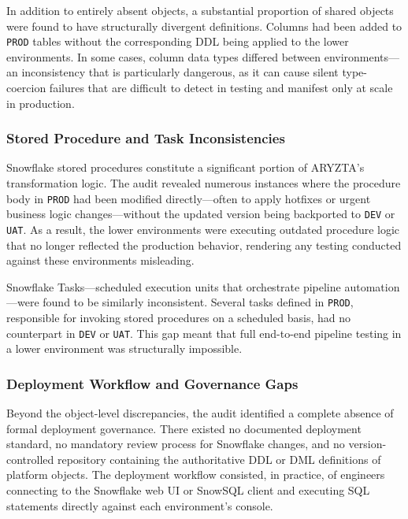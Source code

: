 In addition to entirely absent objects, a substantial proportion of shared objects were found to have structurally divergent definitions. Columns had been added to \texttt{PROD} tables without the corresponding DDL being applied to the lower environments. In some cases, column data types differed between environments---an inconsistency that is particularly dangerous, as it can cause silent type-coercion failures that are difficult to detect in testing and manifest only at scale in production.

\subsubsection{Stored Procedure and Task Inconsistencies}

Snowflake stored procedures constitute a significant portion of ARYZTA's transformation logic. The audit revealed numerous instances where the procedure body in \texttt{PROD} had been modified directly---often to apply hotfixes or urgent business logic changes---without the updated version being backported to \texttt{DEV} or \texttt{UAT}. As a result, the lower environments were executing outdated procedure logic that no longer reflected the production behavior, rendering any testing conducted against these environments misleading.

Snowflake Tasks---scheduled execution units that orchestrate pipeline automation---were found to be similarly inconsistent. Several tasks defined in \texttt{PROD}, responsible for invoking stored procedures on a scheduled basis, had no counterpart in \texttt{DEV} or \texttt{UAT}. This gap meant that full end-to-end pipeline testing in a lower environment was structurally impossible.

\subsubsection{Deployment Workflow and Governance Gaps}

Beyond the object-level discrepancies, the audit identified a complete absence of formal deployment governance. There existed no documented deployment standard, no mandatory review process for Snowflake changes, and no version-controlled repository containing the authoritative DDL or DML definitions of platform objects. The deployment workflow consisted, in practice, of engineers connecting to the Snowflake web UI or SnowSQL client and executing SQL statements directly against each environment's console.

